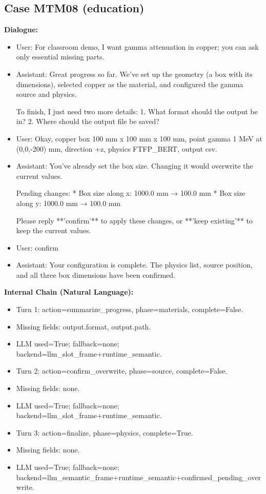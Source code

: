 \documentclass[11pt]{ctexart}
\begin{document}
\subsection{Case MTM08 (education)}
\textbf{Dialogue:}
\begin{itemize}
\item User: For classroom demo, I want gamma attenuation in copper; you can ask only essential missing parts.
\item Assistant: Great progress so far. We've set up the geometry (a box with its dimensions), selected copper as the material, and configured the gamma source and physics.

To finish, I just need two more details:
1. What format should the output be in?
2. Where should the output file be saved?
\item User: Okay, copper box 100 mm x 100 mm x 100 mm, point gamma 1 MeV at (0,0,-200) mm, direction +z, physics FTFP\_BERT, output csv.
\item Assistant: You've already set the box size. Changing it would overwrite the current values.

Pending changes:
*   Box size along x: 1000.0 mm → 100.0 mm
*   Box size along y: 1000.0 mm → 100.0 mm

Please reply **'confirm'** to apply these changes, or **'keep existing'** to keep the current values.
\item User: confirm
\item Assistant: Your configuration is complete. The physics list, source position, and all three box dimensions have been confirmed.
\end{itemize}
\textbf{Internal Chain (Natural Language):}
\begin{itemize}
\item Turn 1: action=summarize\_progress, phase=materials, complete=False.
\item Missing fields: output.format, output.path.
\item LLM used=True; fallback=none; backend=llm\_slot\_frame+runtime\_semantic.
\item Turn 2: action=confirm\_overwrite, phase=source, complete=False.
\item Missing fields: none.
\item LLM used=True; fallback=none; backend=llm\_slot\_frame+runtime\_semantic.
\item Turn 3: action=finalize, phase=physics, complete=True.
\item Missing fields: none.
\item LLM used=True; fallback=none; backend=llm\_semantic\_frame+runtime\_semantic+confirmed\_pending\_overwrite.
\end{itemize}
\end{document}
